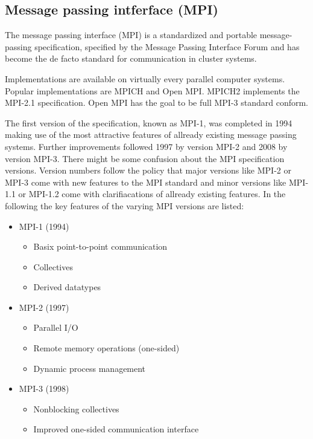 \subsection{Message passing intferface (MPI)}
\label{sec:mpi}

The message passing interface (MPI) is a standardized and portable
message-passing specification, specified by the Message Passing
Interface Forum \cite{ref:mpi_specification} and has become
the de facto standard for communication in cluster systems. 

Implementations are available on virtually every parallel computer systems.
Popular implementations are MPICH and Open MPI. MPICH2 implements the
MPI-2.1 specification. Open MPI has the goal to be full MPI-3 standard conform.

The first version of the specification, known as MPI-1, was completed
in 1994 making use of the most attractive features of allready
existing message passing systems.  Further improvements followed 1997
by version MPI-2 and 2008 by version MPI-3. There might be some
confusion about the MPI specification versions. Version numbers follow
the policy that major versions like MPI-2 or MPI-3 come with new
features to the MPI standard and minor versions like MPI-1.1 or
MPI-1.2 come with clarifiacations of allready existing features.  In
the following the key features of the varying MPI versions are listed:

\begin{itemize}
  \item MPI-1 (1994)
    \begin{itemize}
      \item Basix point-to-point communication
      \item Collectives
      \item Derived datatypes
    \end{itemize}
  \item MPI-2 (1997)
    \begin{itemize}
      \item Parallel I/O
      \item Remote memory operations (one-sided)
      \item Dynamic process management
    \end{itemize}
  \item MPI-3 (1998)
    \begin{itemize}
      \item Nonblocking collectives
      \item Improved one-sided communication interface
    \end{itemize}
\end{itemize}

